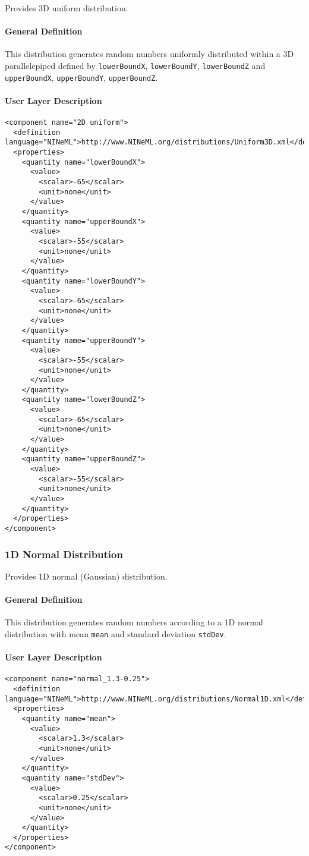 \documentclass{article}
\begin{document}
Provides 3D uniform distribution.

\paragraph{General Definition}
This distribution generates random numbers uniformly distributed within a 3D
parallelepiped defined by {\tt lowerBoundX}, {\tt lowerBoundY}, {\tt lowerBoundZ}
and {\tt upperBoundX}, {\tt upperBoundY}, {\tt upperBoundZ}.

\paragraph{User Layer Description}
\begin{verbatim}
<component name="2D uniform">
  <definition language="NINeML">http://www.NINeML.org/distributions/Uniform3D.xml</definition>
  <properties>
    <quantity name="lowerBoundX">
      <value>
        <scalar>-65</scalar>
        <unit>none</unit>
      </value>
    </quantity>
    <quantity name="upperBoundX">
      <value>
        <scalar>-55</scalar>
        <unit>none</unit>
      </value>
    </quantity>
    <quantity name="lowerBoundY">
      <value>
        <scalar>-65</scalar>
        <unit>none</unit>
      </value>
    </quantity>
    <quantity name="upperBoundY">
      <value>
        <scalar>-55</scalar>
        <unit>none</unit>
      </value>
    </quantity>
    <quantity name="lowerBoundZ">
      <value>
        <scalar>-65</scalar>
        <unit>none</unit>
      </value>
    </quantity>
    <quantity name="upperBoundZ">
      <value>
        <scalar>-55</scalar>
        <unit>none</unit>
      </value>
    </quantity>
  </properties>
</component>
\end{verbatim}

\subsubsection{1D Normal Distribution}
\label{normal1D}

Provides 1D normal (Gaussian) distribution.

\paragraph{General Definition}
This distribution generates random numbers according to a 1D normal distribution
with mean {\tt mean} and standard deviation {\tt stdDev}.

\paragraph{User Layer Description}
\begin{verbatim}
<component name="normal_1.3-0.25">
  <definition language="NINeML">http://www.NINeML.org/distributions/Normal1D.xml</definition>
  <properties>
    <quantity name="mean">
      <value>
        <scalar>1.3</scalar>
        <unit>none</unit>
      </value>
    </quantity>
    <quantity name="stdDev">
      <value>
        <scalar>0.25</scalar>
        <unit>none</unit>
      </value>
    </quantity>
  </properties>
</component>
\end{verbatim}
\end{document}
